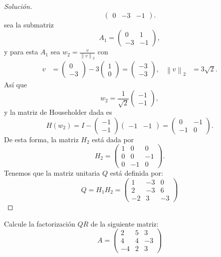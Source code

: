 \documentclass[12pt]{book}
\newcommand\norm[1]{\left\lVert#1\right\rVert}
\newenvironment{solucion}
  {\renewcommand\qedsymbol{$\square$}\begin{proof}[Solución]}
  {\end{proof}}
\begin{document}
\begin{solucion}
\[\begin{pmatrix}
0&-3&-1
\end{pmatrix}.\]
sea la submatriz
\[A_1=\begin{pmatrix}
0&1\\
-3&-1
\end{pmatrix},\]
y para esta $A_1$ sea $w_2=\frac{v}{\norm{v}_2}$ con
\begin{align*}
    v&=\begin{pmatrix}
0\\
-3
\end{pmatrix}-3\begin{pmatrix}
1\\
0
\end{pmatrix}=\begin{pmatrix}
-3\\
-3
\end{pmatrix}, & \norm{v}_2&=3\sqrt{2}.
\end{align*}
Así que
\[w_2=\frac{1}{\sqrt{2}}\begin{pmatrix}
-1\\
-1
\end{pmatrix},\]
y la matriz de Householder dada es
\[H(w_2)=I-\begin{pmatrix}
-1\\
-1
\end{pmatrix}\begin{pmatrix}
-1&-1
\end{pmatrix}=\begin{pmatrix}
0&-1\\
-1&0
\end{pmatrix}.\]
De esta forma, la matriz $H_2$ está dada por
\[H_2=\begin{pmatrix}
1&0&0\\
0&0&-1\\
0&-1&0
\end{pmatrix}.\]
Tenemos que la matriz unitaria $Q$ está definida por:
\[Q=H_1H_2=\begin{pmatrix}
1&-3&0\\
2&-3&6\\
-2&3&-3
\end{pmatrix}\]
\end{solucion}

\eje Calcule la factorización $QR$ de la siguiente matriz:
\[A=\begin{pmatrix}
2 & 5 & 3\\
4 & 4 & -3\\
-4 & 2 & 3
\end{pmatrix}\]
\end{document}
